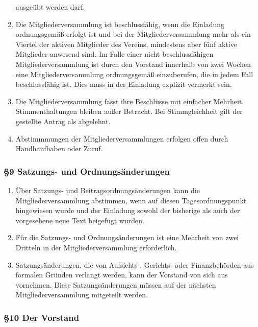 \documentclass[german]{article}
\begin{document}
\begin{enumerate}
  ausgeübt werden darf.
\item
  Die Mitgliederversammlung ist beschlussfähig, wenn die Einladung
  ordnungsgemäß erfolgt ist und bei der Mitgliederversammlung mehr als
  ein Viertel der aktiven Mitglieder des Vereins, mindestens aber fünf
  aktive Mitglieder anwesend sind. Im Falle einer nicht beschlussfähigen
  Mitgliederversammlung ist durch den Vorstand innerhalb von zwei Wochen
  eine Mitgliederversammlung ordnungsgemäß einzuberufen, die in jedem
  Fall beschlussfähig ist. Dies muss in der Einladung explizit vermerkt
  sein.
\item
  Die Mitgliederversammlung fasst ihre Beschlüsse mit einfacher
  Mehrheit. Stimmenthaltungen bleiben außer Betracht. Bei
  Stimmgleichheit gilt der gestellte Antrag als abgelehnt.
\item
  Abstimmmungen der Mitgliederversammlungen erfolgen offen durch
  Handhaufhaben oder Zuruf.
\end{enumerate}

\subsubsection*{§9 Satzungs- und
Ordnungsänderungen}\label{satzungs--und-ordnungsuxe4nderungen}

\begin{enumerate}
\def\labelenumi{\arabic{enumi}.}
\item
  Über Satzungs- und Beitragsordnungsänderungen kann die
  Mitgliederversammlung abstimmen, wenn auf diesen Tagesordnungspunkt
  hingewiesen wurde und der Einladung sowohl der bisherige als auch der
  vorgesehene neue Text beigefügt wurden.
\item
  Für die Satzungs- und Ordnungsänderungen ist eine Mehrheit von zwei
  Dritteln in der Mitgliederversammlung erforderlich.
\item
  Satzungsänderungen, die von Aufsichts-, Gerichts- oder Finanzbehörden
  aus formalen Gründen verlangt werden, kann der Vorstand von sich aus
  vornehmen. Diese Satzungsänderungen müssen auf der nächsten
  Mitgliederversammlung mitgeteilt werden.
\end{enumerate}

\subsubsection*{§10 Der Vorstand}\label{der-vorstand}
\end{document}
